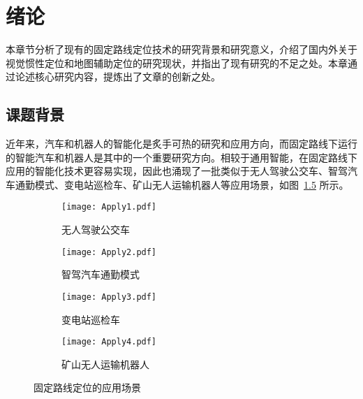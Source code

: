 
\chapter{绪论}

本章节分析了现有的固定路线定位技术的研究背景和研究意义，介绍了国内外关于视觉惯性定位和地图辅助定位的研究现状，并指出了现有研究的不足之处。本章通过论述核心研究内容，提炼出了文章的创新之处。


\section{课题背景}

近年来，汽车和机器人的智能化是炙手可热的研究和应用方向，而固定路线下运行的智能汽车和机器人是其中的一个重要研究方向。相较于通用智能，在固定路线下应用的智能化技术更容易实现，因此也涌现了一批类似于无人驾驶公交车\cite{stephen2023driverless}、智驾汽车通勤模式\cite{xin2023xinchuxing}、变电站巡检车\cite{song2020xinhuawang}、矿山无人运输机器人\cite{li2023keji}等应用场景，如图~\ref{fig:apply} 所示。

\begin{figure}[htbp]
  \centering
  \begin{subfigure}[b]{0.45\textwidth}
      \centering
      \texttt{[image: Apply1.pdf]}
      \caption{无人驾驶公交车\cite{stephen2023driverless}}
      \label{fig:apply_sub1}
  \end{subfigure}
  \begin{subfigure}[b]{0.45\textwidth}
      \centering
      \texttt{[image: Apply2.pdf]}
      \caption{智驾汽车通勤模式\cite{xin2023xinchuxing}}
      \label{fig:apply_sub2}
  \end{subfigure}
  \begin{subfigure}[b]{0.45\textwidth}
      \centering
      \texttt{[image: Apply3.pdf]}
      \caption{变电站巡检车\cite{song2020xinhuawang}}
      \label{fig:apply_sub3}
  \end{subfigure}
  \begin{subfigure}[b]{0.45\textwidth}
      \centering
      \texttt{[image: Apply4.pdf]}
      \caption{矿山无人运输机器人\cite{li2023keji}}
      \label{fig:apply_sub4}
  \end{subfigure}

  \caption{固定路线定位的应用场景}
  \label{fig:apply}
\end{figure}

